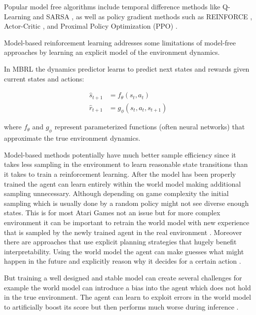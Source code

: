 \documentclass[
	english,
	ruledheaders=section,
	class=report,
	thesis={type=master},
	accentcolor=9c,
	custommargins=true,
	marginpar=false,
	parskip=half-,
	fontsize=11pt,
	pdfa=true,
]{tudapub}
\newcommand{\worldmodel}{world model}
\begin{document}
Popular model free algorithms include temporal difference methods like
Q-Learning \cite{watkins1989learning} and SARSA \cite{rummery1994line}, as well
as policy gradient methods such as REINFORCE \cite{williams1992simple},
Actor-Critic \cite{barto1983neuronlike}, and Proximal Policy Optimization (PPO)
\cite{schulman2017proximal}.

Model-based reinforcement learning addresses some limitations of model-free
approaches by learning an explicit model of the environment dynamics.

In MBRL the dynamics predictor learns to predict next states and rewards given
current states and actions:

\begin{align}
	\hat{s}_{t+1} & = f_\theta(s_t, a_t)        \\
	\hat{r}_{t+1} & = g_\phi(s_t, a_t, s_{t+1})
\end{align}

where $f_\theta$ and $g_\phi$ represent parameterized functions (often neural
networks) that approximate the true environment dynamics.

Model-based methods potentially have much better sample efficiency since it
takes less sampling in the environment to learn reasonable state transitions
than it takes to train a reinforcement learning. After the model has been
properly trained the agent can learn entirely within the \worldmodel{} making
additional sampling unnecessary. Although depending on game complexity the
initial sampling which is usually done by a random policy might not see diverse
enough states. This is for most Atari Games not an issue but for more complex
environment it can be important to retrain the \worldmodel{} with new
experience that is sampled by the newly trained agent in the real environment
\cite{DBLP:conf/nips/JannerFZL19,sutton1991dyna}. Moreover there are approaches that use
explicit planning strategies that hugely benefit interpretability. Using the
\worldmodel{} the agent can make guesses what might happen in the future and
explicitly reason why it decides for a certain action
\cite{schrittwieser2020mastering,DBLP:conf/icml/GreydanusKDF18}.

But training a well designed and stable model can create several challenges for
example the \worldmodel{} can introduce a bias into the agent which does not
hold in the true environment. The agent can learn to exploit errors in the
\worldmodel{} to artificially boost its score but then performs much worse
during inference \cite{talvitie2017self,lambert2020learning}.
\end{document}
